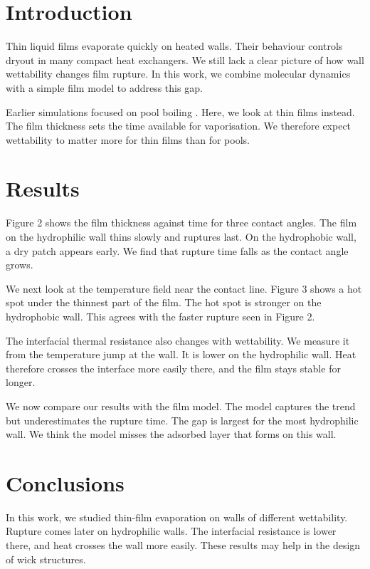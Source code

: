 \documentclass{article}
\begin{document}
\section{Introduction}
Thin liquid films evaporate quickly on heated walls. Their behaviour controls dryout in many compact heat exchangers. We still lack a clear picture of how wall wettability changes film rupture. In this work, we combine molecular dynamics with a simple film model to address this gap.

Earlier simulations focused on pool boiling \cite{a1}. Here, we look at thin films instead. The film thickness sets the time available for vaporisation. We therefore expect wettability to matter more for thin films than for pools.

\section{Results}
Figure 2 shows the film thickness against time for three contact angles. The film on the hydrophilic wall thins slowly and ruptures last. On the hydrophobic wall, a dry patch appears early. We find that rupture time falls as the contact angle grows.

We next look at the temperature field near the contact line. Figure 3 shows a hot spot under the thinnest part of the film. The hot spot is stronger on the hydrophobic wall. This agrees with the faster rupture seen in Figure 2.

The interfacial thermal resistance also changes with wettability. We measure it from the temperature jump at the wall. It is lower on the hydrophilic wall. Heat therefore crosses the interface more easily there, and the film stays stable for longer.

We now compare our results with the film model. The model captures the trend but underestimates the rupture time. The gap is largest for the most hydrophilic wall. We think the model misses the adsorbed layer that forms on this wall.

\section{Conclusions}
In this work, we studied thin-film evaporation on walls of different wettability. Rupture comes later on hydrophilic walls. The interfacial resistance is lower there, and heat crosses the wall more easily. These results may help in the design of wick structures.
\end{document}
